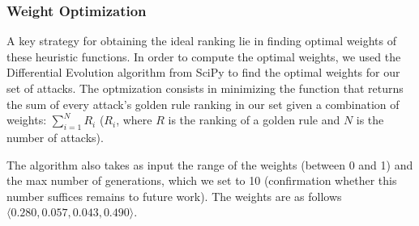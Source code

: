 \documentclass[conference]{IEEEtran}
\begin{document}
\subsubsection{Weight Optimization}
\label{sec:weight-optimization}
A key strategy for obtaining the ideal ranking lie in finding optimal weights
of these heuristic functions. 
%
In  order to compute the optimal weights, we used the Differential Evolution 
algorithm from SciPy\cite{diff-evo-scipy} to find the optimal weights for our set of attacks.
The optmization consists in minimizing the function that returns the sum of 
every attack's golden rule ranking in our set given a combination of weights: 
\indent
$\sum_{i=1}^{N}\mathit{R_i}$ ($\mathit{R_i}$, where $\mathit{R}$ is the 
ranking of a golden rule and $\mathit{N}$ is the number of attacks).

The algorithm also takes as input the range of the weights (between 0 and 1) 
and the max number of generations, which we set to 10 (confirmation whether 
this number suffices remains to future work). The weights are 
as follows $\langle{}0.280, 0.057, 0.043, 0.490\rangle$.
\end{document}

